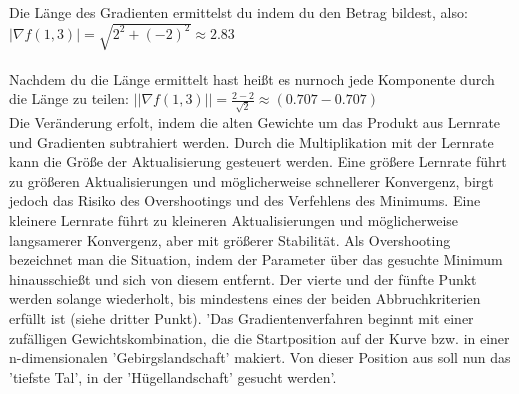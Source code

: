   Die Länge des Gradienten ermittelst du indem du den Betrag bildest, also:
  \newline $|\nabla f(1,3)| = \sqrt{2^2 + (-2)^2} \approx 2.83$
\\
\\
Nachdem du die Länge ermittelt hast heißt es nurnoch jede Komponente durch die Länge zu teilen:
  $||\nabla f(1,3)|| = \frac{2 - 2}{\sqrt{2}} \approx (0.707 - 0.707)$
\\
Die Veränderung erfolt, indem die alten Gewichte um das Produkt aus Lernrate und Gradienten subtrahiert werden. Durch die Multiplikation mit der Lernrate kann die Größe der Aktualisierung gesteuert werden.
  Eine größere Lernrate führt zu größeren Aktualisierungen und möglicherweise schnellerer Konvergenz, birgt jedoch das Risiko des Overshootings und des Verfehlens des Minimums.
  Eine kleinere Lernrate führt zu kleineren Aktualisierungen und möglicherweise langsamerer Konvergenz, aber mit größerer Stabilität. 
Als Overshooting bezeichnet man die Situation, indem der Parameter über das gesuchte Minimum hinausschießt und sich von diesem entfernt.
Der vierte und der fünfte Punkt werden solange wiederholt, bis mindestens eines der beiden Abbruchkriterien erfüllt ist (siehe dritter Punkt).
  'Das Gradientenverfahren beginnt mit einer zufälligen Gewichtskombination, die die Startposition auf der Kurve bzw. in einer n-dimensionalen 'Gebirgslandschaft' makiert.
  Von dieser Position aus soll nun das 'tiefste Tal', in der 'Hügellandschaft' gesucht werden'\cite{GR10}.
  
\fi

\iffalse
